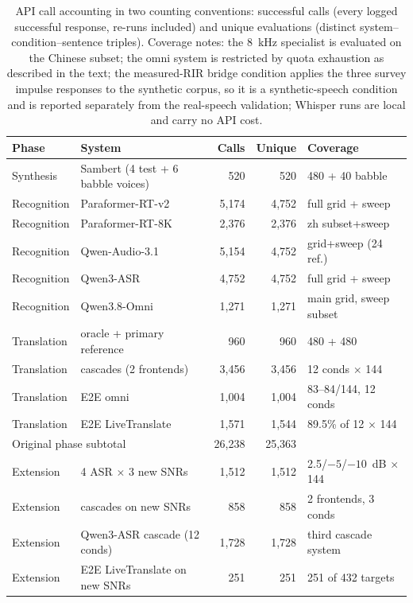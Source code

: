 \begin{table}[t]
\centering
\caption{API call accounting in two counting conventions: successful calls
(every logged successful response, re-runs included) and unique evaluations
(distinct system--condition--sentence triples). Coverage notes: the 8~kHz
specialist is evaluated on the Chinese subset; the omni system is restricted
by quota exhaustion as described in the text; the measured-RIR bridge
condition applies the three survey impulse responses to the synthetic
corpus, so it is a synthetic-speech condition and is reported separately
from the real-speech validation; Whisper runs are local and carry no API
cost.}\label{tab:accounting}
\footnotesize
\setlength{\tabcolsep}{1.7pt}
\begin{tabular}{llrrl}
\toprule
Phase & System & Calls & Unique & Coverage \\
\midrule
Synthesis & Sambert (4 test + 6 babble voices) & 520 & 520 & 480 + 40 babble \\
Recognition & Paraformer-RT-v2 & 5{,}174 & 4{,}752 & full grid + sweep \\
Recognition & Paraformer-RT-8K & 2{,}376 & 2{,}376 & zh subset+sweep \\
Recognition & Qwen-Audio-3.1 & 5{,}154 & 4{,}752 & grid+sweep (24 ref.) \\
Recognition & Qwen3-ASR & 4{,}752 & 4{,}752 & full grid + sweep \\
Recognition & Qwen3.8-Omni & 1{,}271 & 1{,}271 & main grid, sweep subset \\
Translation & oracle + primary reference & 960 & 960 & 480 + 480 \\
Translation & cascades (2 frontends) & 3{,}456 & 3{,}456 & 12 conds $\times$ 144 \\
Translation & E2E omni & 1{,}004 & 1{,}004 & 83--84/144, 12 conds \\
Translation & E2E LiveTranslate & 1{,}571 & 1{,}544 & 89.5\% of 12 $\times$ 144 \\
\midrule
\multicolumn{2}{l}{Original phase subtotal} & 26{,}238 & 25{,}363 & \\
\midrule
Extension & 4 ASR $\times$ 3 new SNRs & 1{,}512 & 1{,}512 & 2.5/$-5$/$-10$~dB $\times$ 144 \\
Extension & cascades on new SNRs & 858 & 858 & 2 frontends, 3 conds \\
Extension & Qwen3-ASR cascade (12 conds) & 1{,}728 & 1{,}728 & third cascade system \\
Extension & E2E LiveTranslate on new SNRs & 251 & 251 & 251 of 432 targets \\

\end{tabular}
\end{table}
